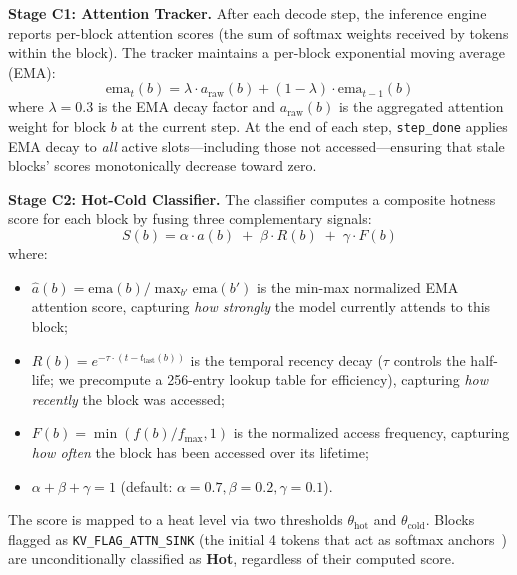 \documentclass[conference]{IEEEtran}
\begin{document}
\textbf{Stage C1: Attention Tracker.} After each decode step, the inference engine reports per-block attention scores (the sum of softmax weights received by tokens within the block). The tracker maintains a per-block exponential moving average (EMA):
\begin{equation}
\text{ema}_{t}(b) = \lambda \cdot a_{\text{raw}}(b) + (1 - \lambda) \cdot \text{ema}_{t-1}(b)
\end{equation}
where $\lambda = 0.3$ is the EMA decay factor and $a_{\text{raw}}(b)$ is the aggregated attention weight for block $b$ at the current step. At the end of each step, \texttt{step\_done} applies EMA decay to \emph{all} active slots---including those not accessed---ensuring that stale blocks' scores monotonically decrease toward zero.

\textbf{Stage C2: Hot-Cold Classifier.} The classifier computes a composite hotness score for each block by fusing three complementary signals:
\begin{equation}
S(b) = \alpha \cdot \hat{a}(b) \;+\; \beta \cdot R(b) \;+\; \gamma \cdot F(b)
\label{eq:hotness}
\end{equation}
where:
\begin{itemize}
\item $\hat{a}(b) = \text{ema}(b) / \max_{b'} \text{ema}(b')$ is the min-max normalized EMA attention score, capturing \emph{how strongly} the model currently attends to this block;
\item $R(b) = e^{-\tau \cdot (t - t_{\text{last}}(b))}$ is the temporal recency decay ($\tau$ controls the half-life; we precompute a 256-entry lookup table for efficiency), capturing \emph{how recently} the block was accessed;
\item $F(b) = \min(f(b) / f_{\max}, 1)$ is the normalized access frequency, capturing \emph{how often} the block has been accessed over its lifetime;
\item $\alpha + \beta + \gamma = 1$ (default: $\alpha{=}0.7, \beta{=}0.2, \gamma{=}0.1$).
\end{itemize}

The score is mapped to a heat level via two thresholds $\theta_{\text{hot}}$ and $\theta_{\text{cold}}$. Blocks flagged as \texttt{KV\_FLAG\_ATTN\_SINK} (the initial 4 tokens that act as softmax anchors~\cite{streamingllm}) are unconditionally classified as \textbf{Hot}, regardless of their computed score.
\end{document}
